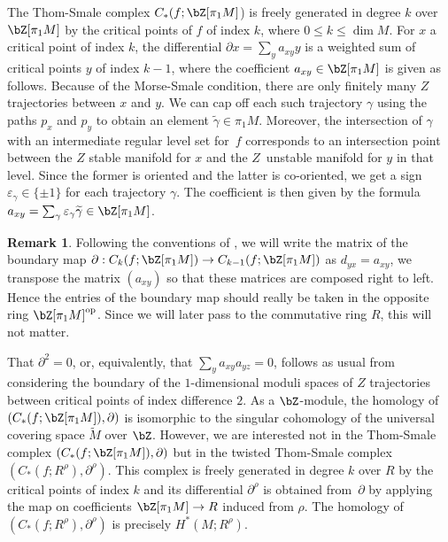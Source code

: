 \documentclass[JEP,XML,SOM,Unicode,NoFloatCountersInSection]{cedram}
\newcommand{\op}{\mathrm{op}}
\theoremstyle{plain}
\theoremstyle{definition}
\newtheorem{remark}[theorem]{Remark}
\let\ve\varepsilon
\begin{document}
The Thom-Smale complex $C_*(f ; \bZ[\pi_1M]$) is freely generated in degree $k$ over $\bZ[\pi_1M]$ by the critical points of $f$ of index $k$, where $0 \leq k \leq \dim M$. For $x$ a critical point of index $k$, the differential $\partial x = \sum_y a_{xy} y$ is a weighted sum of critical points $y$ of index $k-1$, where the coefficient $a_{xy} \in \bZ[\pi_1M]$ is given as follows. Because of the Morse-Smale condition, there are only finitely many $Z$ trajectories between $x$ and $y$. We can cap off each such trajectory $\gamma$ using the paths $p_x$ and $p_y$ to obtain an element $\widetilde \gamma \in \pi_1M$. Moreover, the intersection of $\gamma$ with an intermediate regular level set for~$f$ corresponds to an intersection point between the $Z$ stable manifold for $x$ and the $Z$~unstable manifold for $y$ in that level. Since the former is oriented and the latter is co-oriented, we get a sign $\ve_\gamma \in \{\pm 1\}$ for each trajectory $\gamma$. The coefficient is then given by the formula $a_{xy} = \sum_\gamma \ve_\gamma \widetilde \gamma \in \bZ[\pi_1M]$.

\begin{remark}\label{second remark about IK conventions}
Following the conventions of \cite{IK93}, we will write the matrix of the boundary map $\partial :C_k(f ; \bZ[\pi_1M]) \to C_{k-1}(f ; \bZ[\pi_1 M])$ as $d_{yx}=a_{xy}$, \ie we transpose the matrix $(a_{xy})$ so that these matrices are composed right to left. Hence the entries of the boundary map should really be taken in the opposite ring $\bZ[\pi_1M]^{\op}$. Since we will later pass to the commutative ring $R$, this will not matter.
\end{remark}

That $\partial^2=0$, or, equivalently, that $\sum_y a_{xy} a_{yz}=0$, follows as usual from considering the boundary of the $1$-dimensional moduli spaces of $Z$ trajectories between critical points of index difference $2$. As a $\bZ$-module, the homology of $(C_*(f ; \bZ[\pi_1M]), \partial)$ is isomorphic to the singular cohomology of the universal covering space $\widetilde M$ over $\bZ$. However, we are interested not in the Thom-Smale complex $(C_*(f ; \bZ[\pi_1M]), \partial)$ but in the twisted Thom-Smale complex $(C_*(f ; R^\rho), \partial^\rho)$. This complex is freely generated in degree $k$ over $R$ by the critical points of index $k$ and its differential $\partial^\rho$ is obtained from~$\partial$ by applying the map on coefficients $\bZ[\pi_1M] \to R$ induced from $\rho$. The homology of $(C_*(f; R^\rho),\partial^\rho)$ is precisely $H^*(M;R^\rho)$.
\end{document}
